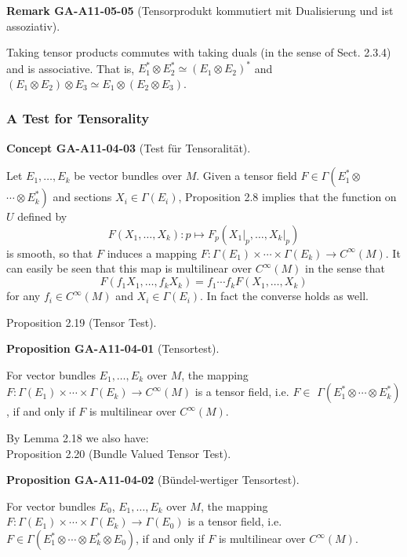 \documentclass[10pt, letterpaper]{article}
\newcommand{\CustomHeading}[3]{%
  \par\medskip\noindent%
  \textbf{#1 #2} \textnormal{(#3)}.\enskip%
}
\newenvironment{PROP}[2]{\begin{unitbox}\CustomHeading{Proposition}{#1}{#2}}{\end{unitbox}}
\newenvironment{REM}[2]{\begin{unitbox}\CustomHeading{Remark}{#1}{#2}}{\end{unitbox}}
\newenvironment{CONC}[2]{\begin{unitbox}\CustomHeading{Concept}{#1}{#2}}{\end{unitbox}}
\begin{document}
\begin{REM}{GA-A11-05-05}{Tensorprodukt kommutiert mit Dualisierung und ist assoziativ}
Taking tensor products commutes with taking duals (in the sense of Sect. 2.3.4) and is associative. That is, $E_{1}^{*} \otimes E_{2}^{*} \simeq\left(E_{1} \otimes E_{2}\right)^{*}$ and $\left(E_{1} \otimes E_{2}\right) \otimes E_{3} \simeq E_{1} \otimes\left(E_{2} \otimes E_{3}\right)$.
\end{REM}



\subsubsection*{A Test for Tensorality}


\begin{CONC}{GA-A11-04-03}{Test für Tensoralität}
Let $E_{1}, \ldots, E_{k}$ be vector bundles over $M$. Given a tensor field $F \in \Gamma\left(E_{1}^{*} \otimes\right.$ $\left.\cdots \otimes E_{k}^{*}\right)$ and sections $X_{i} \in \Gamma\left(E_{i}\right)$, Proposition 2.8 implies that the function on $U$ defined by
$$
F\left(X_{1}, \ldots, X_{k}\right): p \mapsto F_{p}\left(\left.X_{1}\right|_{p}, \ldots,\left.X_{k}\right|_{p}\right)
$$
is smooth, so that $F$ induces a mapping $F: \Gamma\left(E_{1}\right) \times \cdots \times \Gamma\left(E_{k}\right) \rightarrow C^{\infty}(M)$. It can easily be seen that this map is multilinear over $C^{\infty}(M)$ in the sense that
$$
F\left(f_{1} X_{1}, \ldots, f_{k} X_{k}\right)=f_{1} \cdots f_{k} F\left(X_{1}, \ldots, X_{k}\right)
$$
for any $f_{i} \in C^{\infty}(M)$ and $X_{i} \in \Gamma\left(E_{i}\right)$. In fact the converse holds as well.
\end{CONC}


Proposition 2.19 (Tensor Test). 

\begin{PROP}{GA-A11-04-01}{Tensortest}
For vector bundles $E_{1}, \ldots, E_{k}$ over $M$, the mapping $F: \Gamma\left(E_{1}\right) \times \cdots \times \Gamma\left(E_{k}\right) \rightarrow C^{\infty}(M)$ is a tensor field, i.e. $F \in$ $\Gamma\left(E_{1}^{*} \otimes \cdots \otimes E_{k}^{*}\right)$, if and only if $F$ is multilinear over $C^{\infty}(M)$.
\end{PROP}


By Lemma 2.18 we also have:\\

Proposition 2.20 (Bundle Valued Tensor Test). 

\begin{PROP}{GA-A11-04-02}{Bündel-wertiger Tensortest}
For vector bundles $E_{0}$, $E_{1}, \ldots, E_{k}$ over $M$, the mapping $F: \Gamma\left(E_{1}\right) \times \cdots \times \Gamma\left(E_{k}\right) \rightarrow \Gamma\left(E_{0}\right)$ is a tensor field, i.e. $F \in \Gamma\left(E_{1}^{*} \otimes \cdots \otimes E_{k}^{*} \otimes E_{0}\right)$, if and only if $F$ is multilinear over $C^{\infty}(M)$.
\end{PROP}
\end{document}
